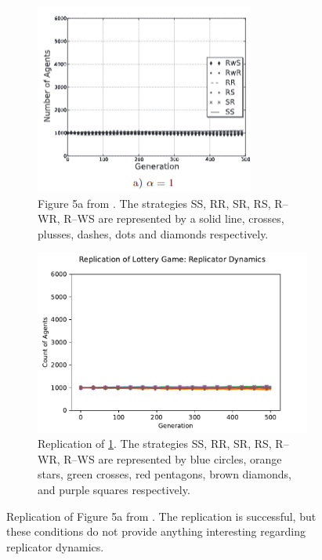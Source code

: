 \FloatBarrier 
\begin{figure}[!h]
  \begin{subfigure}[b]{0.45\textwidth}
    \includegraphics[width=\textwidth]{images/lottery1.png}
    \caption{Figure 5a from \cite{RN30}. The strategies SS, RR, SR, RS, R--WR, R--WS are represented by a solid line, crosses, plusses, dashes, dots and diamonds respectively. }
    \label{lottery1}
  \end{subfigure}
  \hfill
  \begin{subfigure}[b]{0.45\textwidth}
    \includegraphics[width=1.25\textwidth]{images/lottery1_me.pdf}
    \caption{Replication of \ref{lottery1}. The strategies SS, RR, SR, RS, R--WR, R--WS are represented by blue circles, orange stars, green crosses, red pentagons, brown diamonds, and purple squares respectively.}
    \label{lottery1_me}
  \end{subfigure}
  \caption{Replication of Figure 5a from \cite{RN30}. The replication is successful, but these conditions do not provide anything interesting regarding replicator dynamics.  } \label{lottery_comp0}
\end{figure} 
